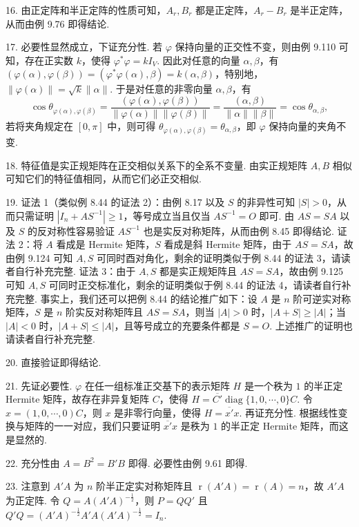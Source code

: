 \documentclass[UTF8, 12pt, fontset=fandol, oneside]{ctexart}
\begin{document}
16. 由正定阵和半正定阵的性质可知，$A_r,B_r$ 都是正定阵，$A_r-B_r$ 是半正定阵，从而由例 9.76 即得结论.

17. 必要性显然成立，下证充分性. 若 $\varphi$ 保持向量的正交性不变，则由例 9.110 可知，存在正实数 $k$，使得 $\varphi^*\varphi=kI_V$. 因此对任意的向量 $\alpha,\beta$，有 $(\varphi(\alpha),\varphi(\beta))=(\varphi^*\varphi(\alpha),\beta)=k(\alpha,\beta)$，特别地，$\|\varphi(\alpha)\|=\sqrt{k}\|\alpha\|$. 于是对任意的非零向量 $\alpha,\beta$，有
\[
\cos\theta_{\varphi(\alpha),\varphi(\beta)}
=\frac{(\varphi(\alpha),\varphi(\beta))}{\|\varphi(\alpha)\|\|\varphi(\beta)\|}
=\frac{(\alpha,\beta)}{\|\alpha\|\|\beta\|}
=\cos\theta_{\alpha,\beta},
\]
若将夹角规定在 $[0,\pi]$ 中，则可得 $\theta_{\varphi(\alpha),\varphi(\beta)}=\theta_{\alpha,\beta}$，即 $\varphi$ 保持向量的夹角不变.

18. 特征值是实正规矩阵在正交相似关系下的全系不变量. 由实正规矩阵 $A,B$ 相似可知它们的特征值相同，从而它们必正交相似.

19. 证法 1（类似例 8.44 的证法 2）：由例 8.17 以及 $S$ 的非异性可知 $|S|>0$，从而只需证明 $|I_n+AS^{-1}|\ge1$，等号成立当且仅当 $AS^{-1}=O$ 即可. 由 $AS=SA$ 以及 $S$ 的反对称性容易验证 $AS^{-1}$ 也是实反对称矩阵，从而由例 8.45 即得结论. 证法 2：将 $A$ 看成是 Hermite 矩阵，$S$ 看成是斜 Hermite 矩阵，由于 $AS=SA$，故由例 9.124 可知 $A,S$ 可同时酉对角化，剩余的证明类似于例 8.44 的证法 3，请读者自行补充完整. 证法 3：由于 $A,S$ 都是实正规矩阵且 $AS=SA$，故由例 9.125 可知 $A,S$ 可同时正交标准化，剩余的证明类似于例 8.44 的证法 4，请读者自行补充完整. 事实上，我们还可以把例 8.44 的结论推广如下：设 $A$ 是 $n$ 阶可逆实对称矩阵，$S$ 是 $n$ 阶实反对称矩阵且 $AS=SA$，则当 $|A|>0$ 时，$|A+S|\ge |A|$；当 $|A|<0$ 时，$|A+S|\le |A|$，且等号成立的充要条件都是 $S=O$. 上述推广的证明也请读者自行补充完整.

20. 直接验证即得结论.

21. 先证必要性. $\varphi$ 在任一组标准正交基下的表示矩阵 $H$ 是一个秩为 $1$ 的半正定 Hermite 矩阵，故存在非异复矩阵 $C$，使得 $H=\overline{C'}\operatorname{diag}\{1,0,\cdots,0\}C$. 令 $x=(1,0,\cdots,0)C$，则 $x$ 是非零行向量，使得 $H=\overline{x'}x$. 再证充分性. 根据线性变换与矩阵的一一对应，我们只要证明 $\overline{x'}x$ 是秩为 $1$ 的半正定 Hermite 矩阵，而这是显然的.

22. 充分性由 $A=B^2=B'B$ 即得. 必要性由例 9.61 即得.

23. 注意到 $A'A$ 为 $n$ 阶半正定实对称矩阵且 $\operatorname{r}(A'A)=\operatorname{r}(A)=n$，故 $A'A$ 为正定阵. 令 $Q=A(A'A)^{-\frac{1}{2}}$，则 $P=QQ'$ 且 $Q'Q=(A'A)^{-\frac{1}{2}}A'A(A'A)^{-\frac{1}{2}}=I_n$.
\end{document}
